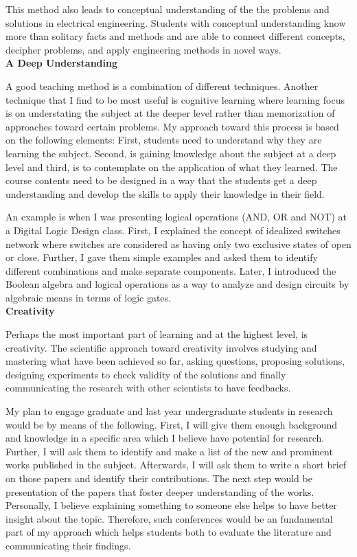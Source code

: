  
 
 This method also leads to conceptual understanding of the the problems and solutions in electrical engineering.    
   Students with conceptual understanding know more than solitary facts and methods and are able to  connect different concepts, decipher problems,  and apply engineering methods in novel ways. \\[0.2cm]
   {\bf A Deep Understanding}
   
   A good teaching method is a combination of different  techniques. Another technique that I find to be most useful is  cognitive learning where learning focus is on understating the 
subject at the deeper level rather than memorization of approaches toward certain problems.
  My approach toward this process is based on the following elements:  First, students need to understand why they are learning the subject. Second, is gaining knowledge about the subject at a deep level and third, is to contemplate on the application of what they learned. 
 The course contents need to be designed in a way that the students get a deep understanding  and develop the skills to apply their knowledge in their field. 
    
    An example is when I was presenting logical operations (AND, OR and NOT) at a Digital Logic Design class. First, I explained the concept of idealized switches network 
    where switches are considered as having only two exclusive states of open or close. Further, I gave them simple examples and  asked them    to identify different combinations and make separate components.      Later, I  introduced the Boolean algebra and logical
operations as a way to analyze and design circuits by algebraic means in terms of logic gates. \\[0.2cm]
   {\bf Creativity}
   
Perhaps the most important part of learning  and at the highest level, is creativity. 
    The scientific approach toward creativity involves studying  and mastering what have been achieved so far, asking  questions, proposing  solutions, designing experiments to check validity of the solutions and finally communicating the research with other scientists to have feedbacks. 
    
    My plan to engage graduate  and last year undergraduate students in research would be by means of the following. First, I will give them enough background and knowledge in a specific area which I believe have potential for research. Further, I will ask them to identify and make a list of the new and prominent works published in the subject. Afterwards, I will ask them to write a short brief on those papers and identify  their contributions. The next step would be presentation of the papers that foster deeper understanding of the works. Personally, I believe explaining something to someone else helps to have better insight about the topic.  Therefore, such conferences would be an fundamental part of my approach which  helps students both to evaluate the literature and communicating their findings.    
    
